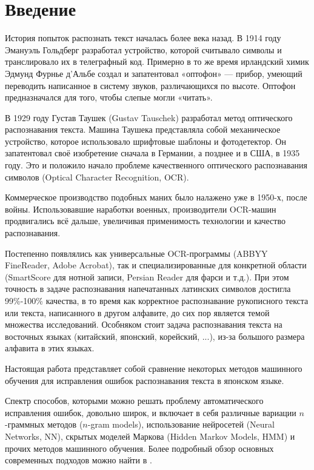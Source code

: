 \documentclass[14pt,russian]{extreport}
\theoremstyle{definition}
\begin{document}
	

\onehalfspacing

\addtocounter{page}{1}
\tableofcontents{}

\newpage
\section*{Введение}

История попыток распознать текст началась более века назад. В 1914 году Эмануэль Гольдберг разработал устройство, которой считывало символы и транслировало их в телеграфный код. Примерно в то же время ирландский химик Эдмунд Фурнье д’Альбе создал и запатентовал «оптофон» — прибор, умеющий переводить написанное в систему звуков, различающихся по высоте. Оптофон предназначался для того, чтобы слепые могли «читать».

В 1929 году Густав Таушек (Gustav Tauschek) разработал метод оптического распознавания текста. Машина Таушека представляла собой механическое устройство, которое использовало шрифтовые шаблоны и фотодетектор. Он запатентовал своё изобретение сначала в Германии, а позднее и в США, в 1935 году. Это и положило начало проблеме качественного оптического распознавания символов (Optical Character Recognition, OCR).

Коммерческое производство подобных маних было налажено уже в 1950-х, после войны. Использовавшие наработки военных, производители OCR-машин продвигались всё дальше, увеличивая применимость технологии и качество распознавания.

Постепенно появлялись как универсальные OCR-программы (ABBYY FineReader, Adobe Acrobat), так и специализированные для конкретной области (SmartScore для нотной записи, Persian Reader для фарси и т.д.). При этом точность в задаче распознавания напечатанных латинских символов достигла 99\%-100\% качества, в то время как корректное распознавание рукописного текста или текста, написанного в другом алфавите, до сих пор является темой множества исследований. Особняком стоит задача распознавания текста на восточных языках (китайский, японский, корейский, ...), из-за большого размера алфавита в этих языках.

Настоящая работа представляет собой сравнение некоторых методов машинного обучения для исправления ошибок распознавания текста в японском языке. 

Спектр способов, которыми можно решать проблему автоматического исправления ошибок, довольно широк, и включает в себя различные вариации $n$-граммных методов ($n$-gram models), использование нейросетей (Neural Networks, NN), скрытых моделей Маркова (Hidden Markov Models, HMM) и прочих методов машинного обучения. Более подробный обзор основных современных подходов можно найти в \cite{das:survey}.
 
\end{document}
